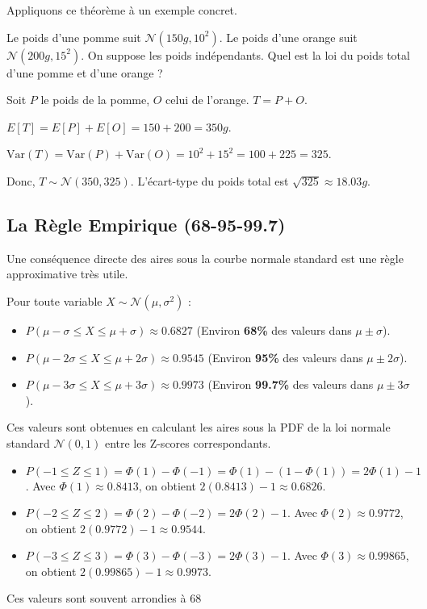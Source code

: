 Appliquons ce théorème à un exemple concret.

\begin{examplebox}
Le poids d'une pomme suit $\mathcal{N}(150g, 10^2)$. Le poids d'une orange suit $\mathcal{N}(200g, 15^2)$. On suppose les poids indépendants. Quel est la loi du poids total d'une pomme et d'une orange ?

Soit $P$ le poids de la pomme, $O$ celui de l'orange. $T = P+O$.

$E[T] = E[P] + E[O] = 150 + 200 = 350g$.

$\text{Var}(T) = \text{Var}(P) + \text{Var}(O) = 10^2 + 15^2 = 100 + 225 = 325$.

Donc, $T \sim \mathcal{N}(350, 325)$. L'écart-type du poids total est $\sqrt{325} \approx 18.03g$.
\end{examplebox}

\subsection{La Règle Empirique (68-95-99.7)}

Une conséquence directe des aires sous la courbe normale standard est une règle approximative très utile.

\begin{theorembox}
Pour toute variable $X \sim \mathcal{N}(\mu, \sigma^2)$ :
\begin{itemize}
    \item $P(\mu - \sigma \le X \le \mu + \sigma) \approx 0.6827$ (Environ \textbf{68\%} des valeurs dans $\mu \pm \sigma$).
    \item $P(\mu - 2\sigma \le X \le \mu + 2\sigma) \approx 0.9545$ (Environ \textbf{95\%} des valeurs dans $\mu \pm 2\sigma$).
    \item $P(\mu - 3\sigma \le X \le \mu + 3\sigma) \approx 0.9973$ (Environ \textbf{99.7\%} des valeurs dans $\mu \pm 3\sigma$).
\end{itemize}
\end{theorembox}

\begin{proofbox}
Ces valeurs sont obtenues en calculant les aires sous la PDF de la loi normale standard $\mathcal{N}(0, 1)$ entre les Z-scores correspondants.
\begin{itemize}
    \item $P(-1 \le Z \le 1) = \Phi(1) - \Phi(-1) = \Phi(1) - (1 - \Phi(1)) = 2\Phi(1) - 1$.
    Avec $\Phi(1) \approx 0.8413$, on obtient $2(0.8413) - 1 \approx 0.6826$.
    \item $P(-2 \le Z \le 2) = \Phi(2) - \Phi(-2) = 2\Phi(2) - 1$.
    Avec $\Phi(2) \approx 0.9772$, on obtient $2(0.9772) - 1 \approx 0.9544$.
    \item $P(-3 \le Z \le 3) = \Phi(3) - \Phi(-3) = 2\Phi(3) - 1$.
    Avec $\Phi(3) \approx 0.99865$, on obtient $2(0.99865) - 1 \approx 0.9973$.
\end{itemize}
Ces valeurs sont souvent arrondies à 68%
\end{proofbox}

